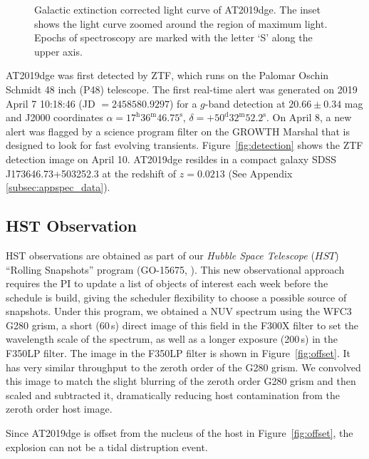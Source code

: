 \documentclass[twocolumn]{aastex63}
\begin{document}
\begin{CJK*}{UTF8}{gbsn}
\begin{figure}[htbp!]
	\caption{Galactic extinction corrected light curve of AT2019dge. The inset shows 
		the light curve zoomed around the region of maximum light. Epochs of spectroscopy are marked 
		with the letter `S' along the upper axis.\label{fig:lightcurve}}
\end{figure}
AT2019dge was first detected by ZTF, which runs on the Palomar Oschin Schmidt 48 inch (P48) 
telescope. The first real-time alert \citep{Patterson2019} was generated  on 2019 April 7 10:18:46 (JD 
$=2458580.9297$) for a $g$-band detection at $20.66\pm0.34$ mag and J2000 coordinates $\alpha 
= 17^{\mathrm{h}}36^{\mathrm{m}}46.75^{\mathrm{s}}$, $\delta = 
+50^{\mathrm{d}}32^{\mathrm{m}}52.2^{\mathrm{s}}$.
On April 8, a new alert was flagged by a science program filter on the 
GROWTH Marshal \citep{Kasliwal2019} that is designed to look for fast evolving transients. 
Figure~\ref{fig:detection} shows the ZTF detection image on April 10. AT2019dge resildes in a compact 
galaxy SDSS J173646.73+503252.3 at the redshift of $z=0.0213$ (See Appendix 
\ref{subsec:appspec_data}). 

\subsection{HST Observation}
HST observations are obtained as part of our  \textit{Hubble Space Telescope} ($HST$) ``Rolling 
Snapshots'' program (GO-15675, \citealt{Fruchter2018}). This new observational approach requires the 
PI to update a list of objects of interest each week before the schedule is build, giving the 
scheduler flexibility to choose a possible source of snapshots. Under this program, we obtained a NUV 
spectrum using the WFC3 G280 grism, a short (60\,s) direct image of this field in the F300X filter to 
set the wavelength scale of the  spectrum, as well as a longer exposure (200\,s) in the F350LP filter. 
The image in the F350LP filter is shown in Figure~\ref{fig:offset}. It has very similar throughput to the 
zeroth order of the G280 grism. We convolved this image to match the slight blurring of the zeroth 
order G280 grism and then scaled and subtracted it, dramatically reducing host contamination from 
the zeroth order host image.

 Since AT2019dge is offset from the nucleus of the host in Figure~\ref{fig:offset}, the explosion can 
 not be a  tidal distruption event.
 

\end{CJK*}
\end{document}
